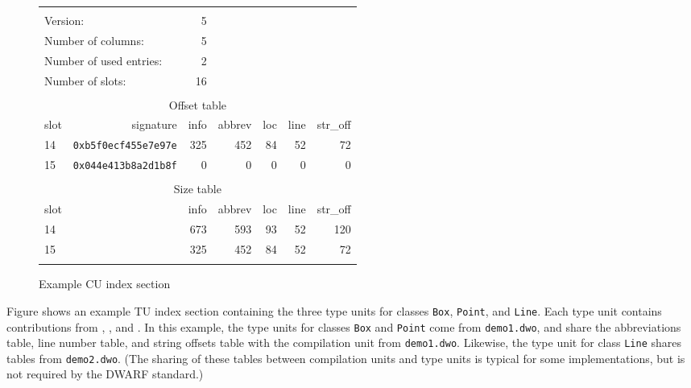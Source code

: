 \begin{figure}[h]
\begin{center}
\begin{tabular}{lrrrrrr}
\hline \\
  \multicolumn{2}{l}{Version:}&                 5 &&&&\\
  \multicolumn{2}{l}{Number of columns:}&       5 &&&&\\
  \multicolumn{2}{l}{Number of used entries:}&  2 &&&&\\
  \multicolumn{2}{l}{Number of slots:}&         16 &&&&\\
\\
  \multicolumn{7}{c}{Offset table} \\
  \hline
  slot&  signature&             info&   abbrev&      loc&     line& str\_off \\
    14& \texttt{0xb5f0ecf455e7e97e}&      325&      452&       84&       52&       72 \\
    15& \texttt{0x044e413b8a2d1b8f}&        0&        0&        0&        0&        0 \\
\\
  \multicolumn{7}{c}{Size table} \\
  \hline
  slot&                    &     info&   abbrev&      loc&     line& str\_off \\
    14&                    &      673&      593&       93&       52&      120 \\
    15&                    &      325&      452&       84&       52&       72 \\
\\ \hline 
\end{tabular}
\end{center}
\caption{Example CU index section}
\label{fig:examplecuindexsection}
\end{figure}

Figure  
shows an example TU index section containing the
three type units for classes \texttt{Box}, \texttt{Point}, and 
\texttt{Line}. Each type unit
contains contributions from \dotdebuginfodwo{}, \dotdebugabbrevdwo{},
\dotdebuglinedwo{} and \dotdebugstroffsetsdwo{}. In this example, the
type units for classes \texttt{Box} and \texttt{Point} come from 
\texttt{demo1.dwo}, and
share the abbreviations table, line number table, and string
offsets table with the compilation unit from \texttt{demo1.dwo}. 
Likewise, the type unit for class \texttt{Line} shares tables 
from \texttt{demo2.dwo}. (The
sharing of these tables between compilation units and type units
is typical for some implementations, but is not required by the
DWARF standard.)

